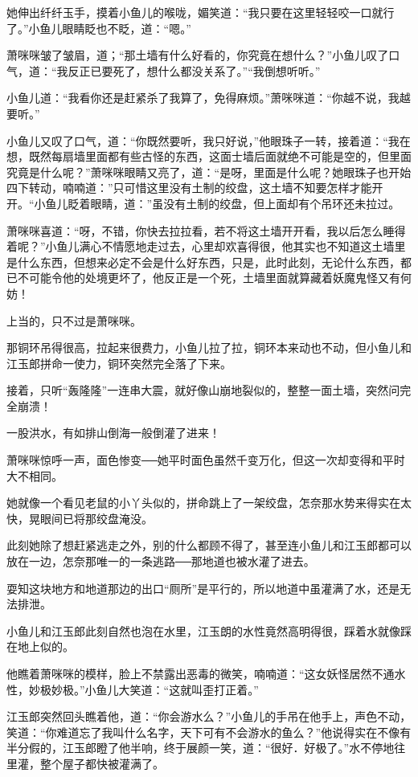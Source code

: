 \documentclass[12pt,oneside]{book}
\begin{document}
她伸出纤纤玉手，摸着小鱼儿的喉咙，媚笑道：``我只要在这里轻轻咬一口就行了。''小鱼儿眼睛眨也不眨，道：``嗯。''

萧咪咪皱了皱眉，道；``那土墙有什么好看的，你究竟在想什么？''小鱼儿叹了口气，道：``我反正已要死了，想什么都没关系了。''``我倒想听听。''

小鱼儿道：``我看你还是赶紧杀了我算了，免得麻烦。''萧咪咪道：``你越不说，我越要听。''

小鱼儿又叹了口气，道：``你既然要听，我只好说，''他眼珠子一转，接着道：``我在想，既然每扇墙里面都有些古怪的东西，这面士墙后面就绝不可能是空的，但里面究竟是什么呢？''萧咪咪眼睛又亮了，道：``是呀，里面是什么呢？她眼珠子也开始四下转动，喃喃道：''只可惜这里没有土制的绞盘，这土墙不知要怎样才能开开。``小鱼儿眨着眼睛，道：''虽没有土制的绞盘，但上面却有个吊环还未拉过。

萧咪咪喜道：``呀，不错，你快去拉拉看，若不将这土墙开开看，我以后怎么睡得着呢？''小鱼儿满心不情愿地走过去，心里却欢喜得很，他其实也不知道这土墙里是什么东西，但想来必定不会是什么好东西，只是，此时此刻，无论什么东西，都已不可能令他的处境更坏了，他反正是一个死，土墙里面就算藏着妖魔鬼怪又有何妨！

上当的，只不过是萧咪咪。

那铜环吊得很高，拉起来很费力，小鱼儿拉了拉，铜环本来动也不动，但小鱼儿和江玉郎拼命一使力，铜环突然完全落了下来。

接着，只听``轰隆隆''一连串大震，就好像山崩地裂似的，整整一面土墙，突然问完全崩溃！

一股洪水，有如排山倒海一般倒灌了进来！

萧咪咪惊呼一声，面色惨变──她平时面色虽然千变万化，但这一次却变得和平时大不相同。

她就像一个看见老鼠的小丫头似的，拼命跳上了一架绞盘，怎奈那水势来得实在太快，晃眼间已将那绞盘淹没。

此刻她除了想赶紧逃走之外，别的什么都顾不得了，甚至连小鱼儿和江玉郎都可以放在一边，怎奈那唯一的一条逃路──那地道也被水灌了进去。

耍知这块地方和地道那边的出口``厕所''是平行的，所以地道中虽灌满了水，还是无法排泄。

小鱼儿和江玉郎此刻自然也泡在水里，江玉朗的水性竟然高明得很，踩着水就像踩在地上似的。

他瞧着萧咪咪的模样，脸上不禁露出恶毒的微笑，喃喃道：``这女妖怪居然不通水性，妙极妙极。''小鱼儿大笑道：``这就叫歪打正着。''

江玉郎突然回头瞧着他，道：``你会游水么？''小鱼儿的手吊在他手上，声色不动，笑道：``你难道忘了我叫什么名字，天下可有不会游水的鱼么？''他说得实在不像有半分假的，江玉郎瞪了他半响，终于展颜一笑，道：``很好．好极了。''水不停地往里灌，整个屋子都快被灌满了。
\end{document}
